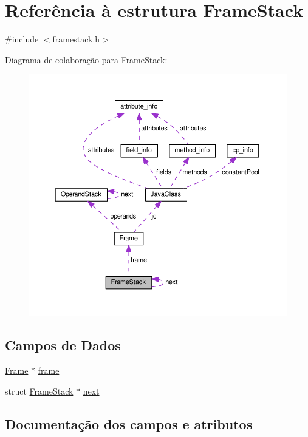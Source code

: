 \hypertarget{structFrameStack}{}\section{Referência à estrutura Frame\+Stack}
\label{structFrameStack}


{\ttfamily \#include $<$framestack.\+h$>$}



Diagrama de colaboração para Frame\+Stack\+:\nopagebreak
\begin{figure}[H]
\begin{center}
\leavevmode
\includegraphics[width=350pt]{structFrameStack__coll__graph}
\end{center}
\end{figure}
\subsection*{Campos de Dados}
\begin{DoxyCompactItemize}
\item 
\hyperlink{structFrame}{Frame} $\ast$ \hyperlink{structFrameStack_a6175986505277602d1e3cdc9fbbfb8b4}{frame}
\item 
struct \hyperlink{structFrameStack}{Frame\+Stack} $\ast$ \hyperlink{structFrameStack_a7b333d40fd3fda54503169413dec8ddd}{next}
\end{DoxyCompactItemize}


\subsection{Documentação dos campos e atributos}
